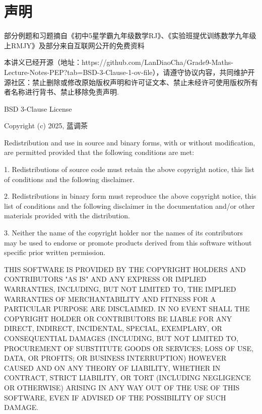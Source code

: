 \documentclass[lang=cn, 10pt, titlestyle=display, oneside, toc=twocol]{elegantbook}
\begin{document}
\section*{声明}
部分例题和习题摘自《初中5星学霸九年级数学RJ》、《实验班提优训练数学九年级上RMJY》及部分来自互联网公开的免费资料

本讲义已经开源（地址：https://github.com/LanDiaoCha/Grade9-Maths-Lecture-Notes-PEP?tab=BSD-3-Clause-1-ov-file），请遵守协议内容，共同维护开源社区：禁止删除或修改原始版权声明和许可证文本、禁止未经许可使用版权所有者名称进行背书、禁止移除免责声明.
\par
BSD 3-Clause License

Copyright (c) 2025, 蓝调茶

Redistribution and use in source and binary forms, with or without
modification, are permitted provided that the following conditions are met:

1. Redistributions of source code must retain the above copyright notice, this
   list of conditions and the following disclaimer.

2. Redistributions in binary form must reproduce the above copyright notice,
   this list of conditions and the following disclaimer in the documentation
   and/or other materials provided with the distribution.

3. Neither the name of the copyright holder nor the names of its
   contributors may be used to endorse or promote products derived from
   this software without specific prior written permission.

THIS SOFTWARE IS PROVIDED BY THE COPYRIGHT HOLDERS AND CONTRIBUTORS "AS IS"
AND ANY EXPRESS OR IMPLIED WARRANTIES, INCLUDING, BUT NOT LIMITED TO, THE
IMPLIED WARRANTIES OF MERCHANTABILITY AND FITNESS FOR A PARTICULAR PURPOSE ARE
DISCLAIMED. IN NO EVENT SHALL THE COPYRIGHT HOLDER OR CONTRIBUTORS BE LIABLE
FOR ANY DIRECT, INDIRECT, INCIDENTAL, SPECIAL, EXEMPLARY, OR CONSEQUENTIAL
DAMAGES (INCLUDING, BUT NOT LIMITED TO, PROCUREMENT OF SUBSTITUTE GOODS OR
SERVICES; LOSS OF USE, DATA, OR PROFITS; OR BUSINESS INTERRUPTION) HOWEVER
CAUSED AND ON ANY THEORY OF LIABILITY, WHETHER IN CONTRACT, STRICT LIABILITY,
OR TORT (INCLUDING NEGLIGENCE OR OTHERWISE) ARISING IN ANY WAY OUT OF THE USE
OF THIS SOFTWARE, EVEN IF ADVISED OF THE POSSIBILITY OF SUCH DAMAGE.
\end{document}
